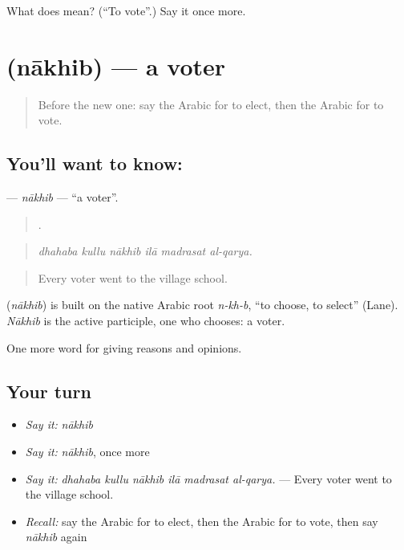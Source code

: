\begin{tcolorbox}[breakable,colback=teal!4,colframe=teal!35!black,title={Before you move on}]
What does  mean? (\textquotedblleft{}To vote\textquotedblright{}.) Say it once more.
\end{tcolorbox}
\section[\texorpdfstring{\ar{ناخب} (nākhib)}{ناخب (nākhib)}]{ (nākhib) — a voter}

\label{lesson:AR-C378-nakhib}



\begin{quote}
Before the new one: say the Arabic for to elect, then the Arabic for to vote.
\end{quote}

\subsection*{You'll want to know: }
\textbf{} — \emph{nākhib} — \textquotedblleft{}a voter\textquotedblright{}.

\begin{quote}
     .
\end{quote}

\begin{quote}
\emph{dhahaba kullu nākhib ilā madrasat al-qarya.}
\end{quote}

\begin{quote}
Every voter went to the village school.
\end{quote}

\begin{cousinweb}
\textbf{} (\emph{nākhib}) is built on the native Arabic root \emph{n-kh-b}, \textquotedblleft{}to choose, to select\textquotedblright{} (Lane). \emph{Nākhib} is the active participle, one who chooses: a voter.
\end{cousinweb}

\begin{grammarlens}[title={What you've built}]
One more word for giving reasons and opinions.
\end{grammarlens}

\subsection*{Your turn}
\begin{itemize}
\raggedright
  \item \emph{Say it:} \emph{nākhib}
  \item \emph{Say it:} \emph{nākhib}, once more
  \item \emph{Say it:} \emph{dhahaba kullu nākhib ilā madrasat al-qarya.} — Every voter went to the village school.
  \item \emph{Recall:} say the Arabic for to elect, then the Arabic for to vote, then say \emph{nākhib} again
\end{itemize}

